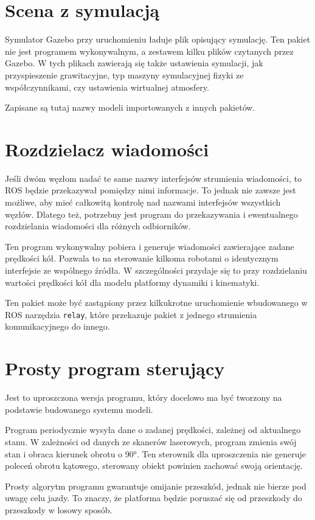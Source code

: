 \section{Scena z symulacją}
	Symulator Gazebo przy uruchomieniu ładuje plik opisujący symulację.
	Ten pakiet nie jest programem wykonywalnym, a zestawem kilku plików czytanych przez Gazebo.
	W tych plikach zawierają się także ustawienia symulacji, jak przyspieszenie grawitacyjne, typ maszyny symulacyjnej fizyki ze współczynnikami, czy ustawienia wirtualnej atmosfery.
	
	Zapisane są tutaj nazwy modeli importowanych z innych pakietów.
	
\section{Rozdzielacz wiadomości}
	Jeśli dwóm węzłom nadać te same nazwy interfejsów strumienia wiadomości, to ROS będzie przekazywał pomiędzy nimi informacje.
	To jednak nie zawsze jest możliwe, aby mieć całkowitą kontrolę nad nazwami interfejsów wszystkich węzłów.
	Dlatego też, potrzebny jest program do przekazywania i ewentualnego rozdzielania wiadomości dla różnych odbiorników.
	
	Ten program wykonywalny pobiera i generuje wiadomości zawierające zadane prędkości kół.
	Pozwala to na sterowanie kilkoma robotami o identycznym interfejsie ze wspólnego źródła.
	W szczególności przydaje się to przy rozdzielaniu wartości prędkości kół dla modelu platformy dynamiki i kinematyki.
	
	Ten pakiet może być zastąpiony przez kilkukrotne uruchomienie wbudowanego w ROS narzędzia \texttt{relay}, które przekazuje pakiet z jednego strumienia komunikacyjnego do innego.
	
\section{Prosty program sterujący}
	Jest to uproszczona wersja programu, który docelowo ma być tworzony na podstawie budowanego systemu modeli.
	
	Program periodycznie wysyła dane o zadanej prędkości, zależnej od aktualnego stanu.
	W zależności od danych ze skanerów laserowych, program zmienia swój stan i obraca kierunek obrotu o \ang{90}.
	Ten sterownik dla uproszczenia nie generuje poleceń obrotu kątowego, sterowany obiekt powinien zachować swoją orientację.
	
	Prosty algorytm programu gwarantuje omijanie przeszkód, jednak nie bierze pod uwagę celu jazdy.
	To znaczy, że platforma będzie poruszać się od przeszkody do przeszkody w losowy sposób.
	
